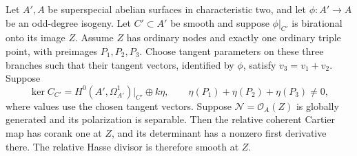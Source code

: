 \begin{lemma}
\label{lem:ss-mixed-triple-point}
Let $A',A$ be superspecial abelian surfaces in characteristic two,
and let $\phi:A'\to A$ be an odd-degree isogeny. Let $C'\subset A'$
be smooth and suppose $\phi|_{C'}$ is birational onto its image $Z$.
Assume $Z$ has ordinary nodes and exactly one ordinary triple point,
with preimages $P_1,P_2,P_3$. Choose tangent parameters on these
three branches such that their tangent vectors, identified by
$\phi$, satisfy $v_3=v_1+v_2$.
Suppose
\[
 \ker C_{C'}=H^0(A',\Omega^1_{A'})|_{C'}\oplus k\eta,
 \qquad \eta(P_1)+\eta(P_2)+\eta(P_3)\ne0,
\]
where values use the chosen tangent vectors. Suppose
$\mathcal N=\mathcal O_A(Z)$ is globally generated and its
polarization is separable. Then the relative coherent Cartier map
has corank one at $Z$, and its determinant has a nonzero first
derivative there. The relative Hasse divisor is therefore smooth
at $Z$.
\end{lemma}
